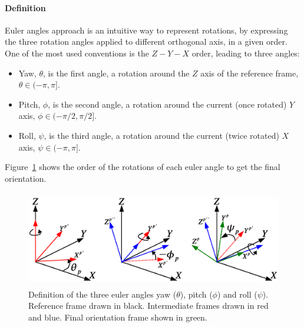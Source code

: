 \paragraph{Definition}
Euler angles approach is an intuitive way to represent rotations, by expressing the three rotation angles applied to different orthogonal axis, in a given order. One of the most used conventions is the $Z-Y-X$ order, leading to three angles:
\begin{itemize}
  \item	Yaw, $\theta$, is the first angle, a rotation around the $Z$ axis of the reference frame, $\theta \in (-\pi, \pi]$.
  \item Pitch, $\phi$, is the second angle, a rotation around the current (once rotated) $Y$ axis, $\phi \in (-\pi/2, \pi/2]$.
  \item Roll, $\psi$, is the third angle, a rotation around the current (twice rotated) $X$ axis, $\psi \in (-\pi, \pi]$.
\end{itemize}
Figure~\ref{appF:fig:threeAngles} shows the order of the rotations of each euler angle to get the final orientation.
\begin{figure}[h]
\centering
\includegraphics[height=4.2cm]{figures/threeAngles.eps}
\caption{Definition of the three euler angles yaw ($\theta$), pitch ($\phi$) and roll ($\psi$). Reference frame drawn in black. Intermediate frames drawn in red and blue. Final orientation frame shown in green. }
\label{appF:fig:threeAngles}
\end{figure}


